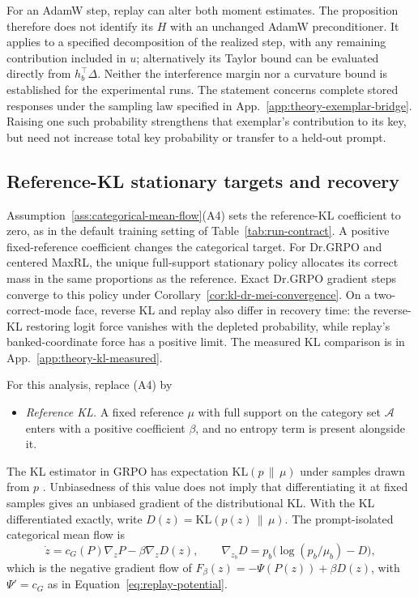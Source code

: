 \documentclass{article}
\newcommand{\1}{\mathbf 1}
\theoremstyle{remark}
\theoremstyle{definition}
\theoremstyle{plain}
\begin{document}
For an AdamW step, replay can alter both moment estimates. The proposition
therefore does not identify its $H$ with an unchanged AdamW preconditioner.
It applies to a specified decomposition of the realized step, with any
remaining contribution included in $u$; alternatively its Taylor bound can
be evaluated directly from $h_b^\top\Delta$. Neither the interference margin
nor a curvature bound is established for the experimental runs.
The statement concerns complete stored responses under the sampling law
specified in App.~\ref{app:theory-exemplar-bridge}. Raising one such
probability strengthens that exemplar's contribution to its key, but need
not increase total key probability or transfer to a held-out prompt.


\subsection{Reference-KL stationary targets and recovery}
\label{app:theory-kl}

Assumption~\ref{ass:categorical-mean-flow}(A4) sets the reference-KL
coefficient to zero, as in the default training setting of
Table~\ref{tab:run-contract}. A positive fixed-reference coefficient changes
the categorical target. For Dr.GRPO and centered MaxRL, the unique
full-support stationary policy allocates its correct mass in the same
proportions as the reference. Exact Dr.GRPO gradient steps converge to this
policy under Corollary~\ref{cor:kl-dr-mei-convergence}. On a two-correct-mode
face, reverse KL and replay also differ in recovery time: the reverse-KL
restoring logit force vanishes with the depleted probability, while replay's
banked-coordinate force has a positive limit. The measured KL comparison is
in App.~\ref{app:theory-kl-measured}.

For this analysis, replace (A4) by

\begin{itemize}
\item[(A4$'$)] \emph{Reference KL.} A fixed reference $\mu$ with full support
  on the category set $\mathcal A$ enters with a positive coefficient $\beta$,
  and no entropy term is present alongside it.
\end{itemize}
The KL estimator in GRPO has expectation $\mathrm{KL}(p\,\|\,\mu)$
under samples drawn from $p$ \citep{shao2024deepseekmath}. Unbiasedness of
this value does not imply that differentiating it at fixed samples gives an
unbiased gradient of the distributional KL. With the KL differentiated
exactly, write $D(z)=\mathrm{KL}(p(z)\,\|\,\mu)$. The prompt-isolated
categorical mean flow is
\begin{equation}
  \dot z=c_G(P)\nabla_zP-\beta\nabla_zD(z),
  \qquad
  \nabla_{z_b}D=p_b\big(\log(p_b/\mu_b)-D\big),
  \label{eq:kl-mean-flow}
\end{equation}
which is the negative gradient flow of
$F_\beta(z)=-\Psi(P(z))+\beta D(z)$, with $\Psi'=c_G$ as in
Equation~\eqref{eq:replay-potential}.
\end{document}
